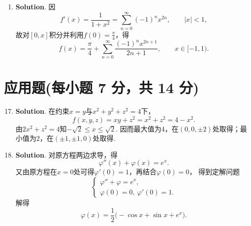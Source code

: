 \documentclass[../Main.tex]{subfiles}
\begin{document}
\begin{enumerate}
    \item \textbf{Solution}. 因
          \[
              f'(x)=\frac{1}{1+x^{2}}=\sum_{n=0}^{\infty}(-1)^{n}x^{2n},\qquad |x|<1,
          \]
          故对$[0,x]$积分并利用$f(0)=\frac{\pi}{4}$，得
          \[
              f(x)=\frac{\pi}{4}+\sum_{n=0}^{\infty}\frac{(-1)^{n}x^{2n+1}}{2n+1},\qquad x\in[-1,1).
          \]
\end{enumerate}

\section{应用题(每小题 7 分，共 14 分)}
\begin{enumerate}
    \setcounter{enumi}{16}
    \item \textbf{Solution}. 在约束$x=y$与$x^{2}+y^{2}+z^{2}=4$下，
          \[
              f(x,y,z)=xy+z^{2}=x^{2}+z^{2}=4-x^{2}.
          \]
          由$2x^{2}+z^{2}=4$知$- \sqrt2\le x\le \sqrt2$.
          因而最大值为$4$，在$(0,0,\pm2)$处取得；最小值为$2$，在$(\pm1,\pm1,0)$处取得.

    \item \textbf{Solution}. 对原方程两边求导，得
          \[
              \varphi''(x)+\varphi(x)=e^{x}.
          \]
          又由原方程在$x=0$处可得$\varphi'(0)=1$，再结合$\varphi(0)=0$，
          得到定解问题
          \[
              \begin{cases}
                  \varphi''+\varphi=e^{x}, \\
                  \varphi(0)=0,\ \varphi'(0)=1.
              \end{cases}
          \]
          解得
          \[
              \varphi(x)=\frac12\bigl(-\cos x+\sin x+e^{x}\bigr).
          \]
\end{enumerate}
\end{document}
